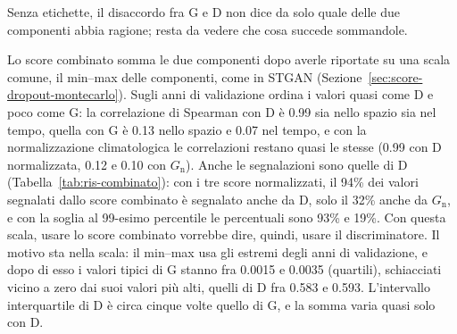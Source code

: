 \label{sec:ris-combinato}

Senza etichette, il disaccordo fra G e D non dice da solo quale delle due componenti abbia ragione; resta da vedere che cosa succede sommandole.

Lo score combinato somma le due componenti dopo averle riportate su una scala comune, il min--max delle componenti, come in STGAN (Sezione~\ref{sec:score-dropout-montecarlo}). Sugli anni di validazione ordina i valori quasi come D e poco come G: la correlazione di Spearman con D è 0.99 sia nello spazio sia nel tempo, quella con G è 0.13 nello spazio e 0.07 nel tempo, e con la normalizzazione climatologica le correlazioni restano quasi le stesse (0.99 con D normalizzata, 0.12 e 0.10 con $G_{\mathrm{n}}$). Anche le segnalazioni sono quelle di D (Tabella~\ref{tab:ris-combinato}): con i tre score normalizzati, il 94\% dei valori segnalati dallo score combinato è segnalato anche da D, solo il 32\% anche da $G_{\mathrm{n}}$, e con la soglia al 99-esimo percentile le percentuali sono 93\% e 19\%. Con questa scala, usare lo score combinato vorrebbe dire, quindi, usare il discriminatore. Il motivo sta nella scala: il min--max usa gli estremi degli anni di validazione, e dopo di esso i valori tipici di G stanno fra 0.0015 e 0.0035 (quartili), schiacciati vicino a zero dai suoi valori più alti, quelli di D fra 0.583 e 0.593. L'intervallo interquartile di D è circa cinque volte quello di G, e la somma varia quasi solo con D.

